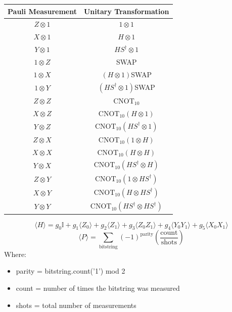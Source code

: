 \documentclass{article}
\begin{document}
\begin{table}[H]
	\centering
	\begin{tabular}{|c|c|}
		\hline
		\textbf{Pauli Measurement} & \textbf{Unitary Transformation}                        \\
		\hline
		\(Z \otimes 1\)            & \(1 \otimes 1\)                                        \\
		\hline
		\(X \otimes 1\)            & \(H \otimes 1\)                                        \\
		\hline
		\(Y \otimes 1\)            & \(H S^\dagger \otimes 1\)                              \\
		\hline
		\(1 \otimes Z\)            & SWAP                                                   \\
		\hline
		\(1 \otimes X\)            & \((H \otimes 1)\)SWAP                                  \\
		\hline
		\(1 \otimes Y\)            & \((H S^\dagger \otimes 1)\)SWAP                        \\
		\hline
		\(Z \otimes Z\)            & \(\text{CNOT}_{10}\)                                   \\
		\hline
		\(X \otimes Z\)            & \(\text{CNOT}_{10} (H \otimes 1)\)                     \\
		\hline
		\(Y \otimes Z\)            & \(\text{CNOT}_{10} (H S^\dagger \otimes 1)\)           \\
		\hline
		\(Z \otimes X\)            & \(\text{CNOT}_{10} (1 \otimes H)\)                     \\
		\hline
		\(X \otimes X\)            & \(\text{CNOT}_{10} (H \otimes H)\)                     \\
		\hline
		\(Y \otimes X\)            & \(\text{CNOT}_{10} (H S^\dagger \otimes H)\)           \\
		\hline
		\(Z \otimes Y\)            & \(\text{CNOT}_{10} (1 \otimes H S^\dagger)\)           \\
		\hline
		\(X \otimes Y\)            & \(\text{CNOT}_{10} (H \otimes H S^\dagger)\)           \\
		\hline
		\(Y \otimes Y\)            & \(\text{CNOT}_{10} (H S^\dagger \otimes H S^\dagger)\) \\
		\hline
	\end{tabular}
\end{table}
\begin{equation*}
	\langle H \rangle = g_0 \mathbb{I} + g_1 \langle Z_0 \rangle + g_2 \langle Z_1 \rangle + g_3 \langle Z_0 Z_1 \rangle + g_4 \langle Y_0 Y_1 \rangle + g_5 \langle X_0 X_1 \rangle
\end{equation*}
\begin{equation*}
	\langle P \rangle = \sum_{\text{bitstring}}  (-1)^{\text{parity}} \left( \frac{\text{count}}{\text{shots}} \right)
\end{equation*}
Where:
\begin{itemize}
	\item parity = bitstring.count('1') mod 2
	\item count = number of times the bitstring was measured
	\item shots = total number of measurements
\end{itemize}
\end{document}
